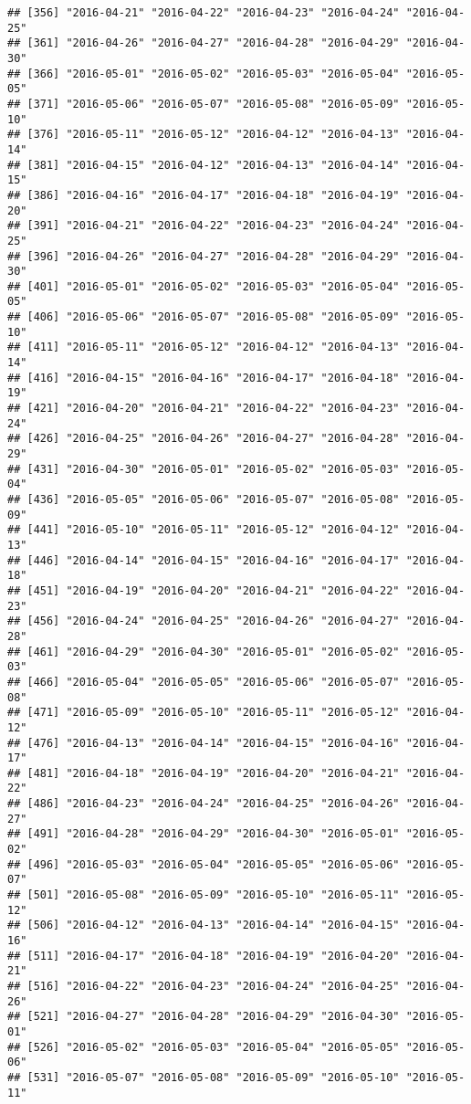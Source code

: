 \documentclass[
]{article}
\begin{document}
\begin{verbatim}
## [356] "2016-04-21" "2016-04-22" "2016-04-23" "2016-04-24" "2016-04-25"
## [361] "2016-04-26" "2016-04-27" "2016-04-28" "2016-04-29" "2016-04-30"
## [366] "2016-05-01" "2016-05-02" "2016-05-03" "2016-05-04" "2016-05-05"
## [371] "2016-05-06" "2016-05-07" "2016-05-08" "2016-05-09" "2016-05-10"
## [376] "2016-05-11" "2016-05-12" "2016-04-12" "2016-04-13" "2016-04-14"
## [381] "2016-04-15" "2016-04-12" "2016-04-13" "2016-04-14" "2016-04-15"
## [386] "2016-04-16" "2016-04-17" "2016-04-18" "2016-04-19" "2016-04-20"
## [391] "2016-04-21" "2016-04-22" "2016-04-23" "2016-04-24" "2016-04-25"
## [396] "2016-04-26" "2016-04-27" "2016-04-28" "2016-04-29" "2016-04-30"
## [401] "2016-05-01" "2016-05-02" "2016-05-03" "2016-05-04" "2016-05-05"
## [406] "2016-05-06" "2016-05-07" "2016-05-08" "2016-05-09" "2016-05-10"
## [411] "2016-05-11" "2016-05-12" "2016-04-12" "2016-04-13" "2016-04-14"
## [416] "2016-04-15" "2016-04-16" "2016-04-17" "2016-04-18" "2016-04-19"
## [421] "2016-04-20" "2016-04-21" "2016-04-22" "2016-04-23" "2016-04-24"
## [426] "2016-04-25" "2016-04-26" "2016-04-27" "2016-04-28" "2016-04-29"
## [431] "2016-04-30" "2016-05-01" "2016-05-02" "2016-05-03" "2016-05-04"
## [436] "2016-05-05" "2016-05-06" "2016-05-07" "2016-05-08" "2016-05-09"
## [441] "2016-05-10" "2016-05-11" "2016-05-12" "2016-04-12" "2016-04-13"
## [446] "2016-04-14" "2016-04-15" "2016-04-16" "2016-04-17" "2016-04-18"
## [451] "2016-04-19" "2016-04-20" "2016-04-21" "2016-04-22" "2016-04-23"
## [456] "2016-04-24" "2016-04-25" "2016-04-26" "2016-04-27" "2016-04-28"
## [461] "2016-04-29" "2016-04-30" "2016-05-01" "2016-05-02" "2016-05-03"
## [466] "2016-05-04" "2016-05-05" "2016-05-06" "2016-05-07" "2016-05-08"
## [471] "2016-05-09" "2016-05-10" "2016-05-11" "2016-05-12" "2016-04-12"
## [476] "2016-04-13" "2016-04-14" "2016-04-15" "2016-04-16" "2016-04-17"
## [481] "2016-04-18" "2016-04-19" "2016-04-20" "2016-04-21" "2016-04-22"
## [486] "2016-04-23" "2016-04-24" "2016-04-25" "2016-04-26" "2016-04-27"
## [491] "2016-04-28" "2016-04-29" "2016-04-30" "2016-05-01" "2016-05-02"
## [496] "2016-05-03" "2016-05-04" "2016-05-05" "2016-05-06" "2016-05-07"
## [501] "2016-05-08" "2016-05-09" "2016-05-10" "2016-05-11" "2016-05-12"
## [506] "2016-04-12" "2016-04-13" "2016-04-14" "2016-04-15" "2016-04-16"
## [511] "2016-04-17" "2016-04-18" "2016-04-19" "2016-04-20" "2016-04-21"
## [516] "2016-04-22" "2016-04-23" "2016-04-24" "2016-04-25" "2016-04-26"
## [521] "2016-04-27" "2016-04-28" "2016-04-29" "2016-04-30" "2016-05-01"
## [526] "2016-05-02" "2016-05-03" "2016-05-04" "2016-05-05" "2016-05-06"
## [531] "2016-05-07" "2016-05-08" "2016-05-09" "2016-05-10" "2016-05-11"

\end{verbatim}
\end{document}
